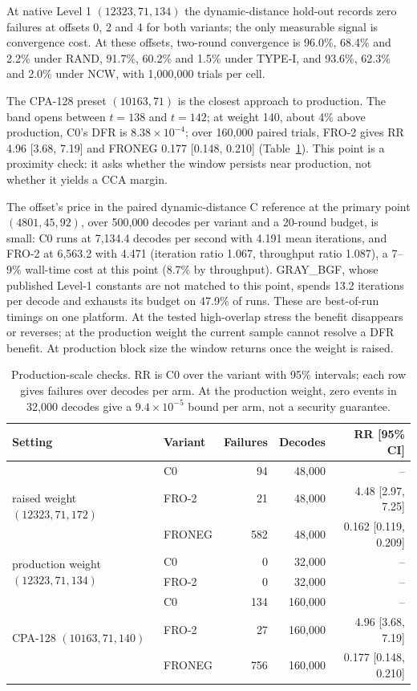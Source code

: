 \documentclass[lettersize,journal]{IEEEtran}
\begin{document}
At native Level 1 $(12323,71,134)$ the dynamic-distance hold-out records zero failures at offsets 0, 2 and 4 for both variants; the only measurable signal is convergence cost. At these offsets, two-round convergence is 96.0\%, 68.4\% and 2.2\% under RAND, 91.7\%, 60.2\% and 1.5\% under TYPE-I, and 93.6\%, 62.3\% and 2.0\% under NCW, with 1{,}000{,}000 trials per cell.

The CPA-128 preset $(10163,71)$ is the closest approach to production. The band opens between $t=138$ and $t=142$; at weight 140, about 4\% above production, C0's DFR is $8.38\times10^{-4}$; over 160{,}000 paired trials, FRO-2 gives RR 4.96 [3.68, 7.19] and FRONEG 0.177 [0.148, 0.210] (Table~\ref{tab:added}). This point is a proximity check: it asks whether the window persists near production, not whether it yields a CCA margin.

The offset's price in the paired dynamic-distance C reference at the primary point $(4801,45,92)$, over 500{,}000 decodes per variant and a 20-round budget, is small: C0 runs at 7{,}134.4 decodes per second with 4.191 mean iterations, and FRO-2 at 6{,}563.2 with 4.471 (iteration ratio 1.067, throughput ratio 1.087), a 7--9\% wall-time cost at this point (8.7\% by throughput). GRAY\_BGF, whose published Level-1 constants are not matched to this point, spends 13.2 iterations per decode and exhausts its budget on 47.9\% of runs. These are best-of-run timings on one platform. At the tested high-overlap stress the benefit disappears or reverses; at the production weight the current sample cannot resolve a DFR benefit. At production block size the window returns once the weight is raised.

\begin{table}[!t]
\centering
\small
\caption{Production-scale checks. RR is C0 over the variant with 95\% intervals; each row gives failures over decodes per arm. At the production weight, zero events in 32{,}000 decodes give a $9.4\times10^{-5}$ bound per arm, not a security guarantee.}
\label{tab:added}
\begin{tabular}{llrrr}
\toprule
Setting & Variant & Failures & Decodes & RR [95\% CI] \\
\midrule
\multirow{3}{*}{raised weight $(12323,71,172)$} & C0 & 94 & 48{,}000 & -- \\
 & FRO-2 & 21 & 48{,}000 & 4.48 [2.97, 7.25] \\
 & FRONEG & 582 & 48{,}000 & 0.162 [0.119, 0.209] \\
\midrule
\multirow{2}{*}{production weight $(12323,71,134)$} & C0 & 0 & 32{,}000 & -- \\
 & FRO-2 & 0 & 32{,}000 & -- \\
\midrule
\multirow{3}{*}{CPA-128 $(10163,71,140)$} & C0 & 134 & 160{,}000 & -- \\
 & FRO-2 & 27 & 160{,}000 & 4.96 [3.68, 7.19] \\
 & FRONEG & 756 & 160{,}000 & 0.177 [0.148, 0.210] \\
\bottomrule
\end{tabular}
\end{table}
\end{document}
